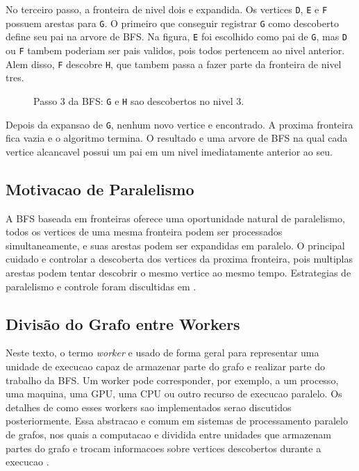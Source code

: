 \documentclass{article}
\begin{document}
No terceiro passo, a fronteira de nivel dois e expandida. Os vertices
\texttt{D}, \texttt{E} e \texttt{F} possuem arestas para \texttt{G}. O primeiro
que conseguir registrar \texttt{G} como descoberto define seu pai na arvore de
BFS. Na figura, \texttt{E} foi escolhido como pai de \texttt{G}, mas
\texttt{D} ou \texttt{F} tambem poderiam ser pais validos, pois todos pertencem
ao nivel anterior. Alem disso, \texttt{F} descobre \texttt{H}, que tambem passa
a fazer parte da fronteira de nivel tres.

\begin{figure}[H]
\centering
{}
\caption{Passo 3 da BFS: \texttt{G} e \texttt{H} sao descobertos no nivel 3.}
\label{fig:bfs-step3}
\end{figure}

Depois da expansao de \texttt{G}, nenhum novo vertice e encontrado. A proxima
fronteira fica vazia e o algoritmo termina. O resultado e uma arvore de BFS na
qual cada vertice alcancavel possui um pai em um nivel imediatamente anterior ao
seu.

\subsection{Motivacao de Paralelismo}
A BFS baseada em fronteiras oferece uma oportunidade natural de paralelismo, todos
os vertices de uma mesma fronteira podem ser processados simultaneamente, e suas
arestas podem ser expandidas em paralelo. O principal cuidado e controlar a
descoberta dos vertices da proxima fronteira, pois multiplas arestas podem tentar
descobrir o mesmo vertice ao mesmo tempo. Estrategias de paralelismo e controle foram
discultidas em \cite{merrillgpu}. 

\subsection{Divisão do Grafo entre Workers}
Neste texto, o termo \textit{worker} e usado de forma geral para representar uma
unidade de execucao capaz de armazenar parte do grafo e realizar parte do trabalho
da BFS. Um worker pode corresponder, por exemplo, a um processo, uma maquina, uma
GPU, uma CPU ou outro recurso de execucao paralelo. Os detalhes de como esses
workers sao implementados serao discutidos posteriormente. Essa abstracao e
comum em sistemas de processamento paralelo de grafos, nos quais a computacao e
dividida entre unidades que armazenam partes do grafo e trocam informacoes sobre
vertices descobertos durante a execucao \cite{merrillgpu}.
\end{document}
